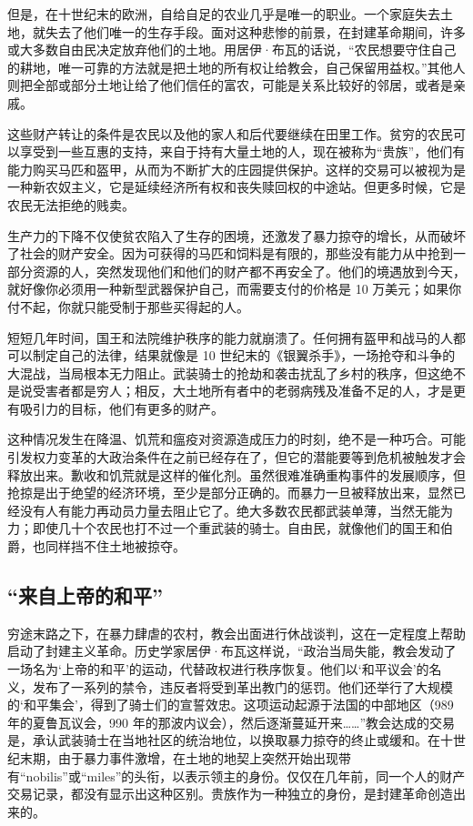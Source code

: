 但是，在十世纪末的欧洲，自给自足的农业几乎是唯一的职业。一个家庭失去土地，就失去了他们唯一的生存手段。面对这种悲惨的前景，在封建革命期间，许多或大多数自由民决定放弃他们的土地。用居伊·布瓦的话说，“农民想要守住自己的耕地，唯一可靠的方法就是把土地的所有权让给教会，自己保留用益权。”其他人则把全部或部分土地让给了他们信任的富农，可能是关系比较好的邻居，或者是亲戚。


这些财产转让的条件是农民以及他的家人和后代要继续在田里工作。贫穷的农民可以享受到一些互惠的支持，来自于持有大量土地的人，现在被称为“贵族”，他们有能力购买马匹和盔甲，从而为不断扩大的庄园提供保护。这样的交易可以被视为是一种新农奴主义，它是延续经济所有权和丧失赎回权的中途站。但更多时候，它是农民无法拒绝的贱卖。

生产力的下降不仅使贫农陷入了生存的困境，还激发了暴力掠夺的增长，从而破坏了社会的财产安全。因为可获得的马匹和饲料是有限的，那些没有能力从中抢到一部分资源的人，突然发现他们和他们的财产都不再安全了。他们的境遇放到今天，就好像你必须用一种新型武器保护自己，而需要支付的价格是 10 万美元；如果你付不起，你就只能受制于那些买得起的人。

短短几年时间，国王和法院维护秩序的能力就崩溃了。任何拥有盔甲和战马的人都可以制定自己的法律，结果就像是 10 世纪末的《银翼杀手》，一场抢夺和斗争的大混战，当局根本无力阻止。武装骑士的抢劫和袭击扰乱了乡村的秩序，但这绝不是说受害者都是穷人；相反，大土地所有者中的老弱病残及准备不足的人，才是更有吸引力的目标，他们有更多的财产。

这种情况发生在降温、饥荒和瘟疫对资源造成压力的时刻，绝不是一种巧合。可能引发权力变革的大政治条件在之前已经存在了，但它的潜能要等到危机被触发才会释放出来。歉收和饥荒就是这样的催化剂。虽然很难准确重构事件的发展顺序，但抢掠是出于绝望的经济环境，至少是部分正确的。而暴力一旦被释放出来，显然已经没有人有能力再动员力量去阻止它了。绝大多数农民都武装单薄，当然无能为力；即使几十个农民也打不过一个重武装的骑士。自由民，就像他们的国王和伯爵，也同样挡不住土地被掠夺。

\subsection{“来自上帝的和平”}
穷途末路之下，在暴力肆虐的农村，教会出面进行休战谈判，这在一定程度上帮助启动了封建主义革命。历史学家居伊·布瓦这样说，“政治当局失能，教会发动了一场名为‘上帝的和平’的运动，代替政权进行秩序恢复。他们以‘和平议会’的名义，发布了一系列的禁令，违反者将受到革出教门的惩罚。他们还举行了大规模的‘和平集会’，得到了骑士们的宣誓效忠。这项运动起源于法国的中部地区（989 年的夏鲁瓦议会，990 年的那波内议会），然后逐渐蔓延开来……”教会达成的交易是，承认武装骑士在当地社区的统治地位，以换取暴力掠夺的终止或缓和。在十世纪末期，由于暴力事件激增，在土地的地契上突然开始出现带有“nobilis”或“miles”的头衔，以表示领主的身份。仅仅在几年前，同一个人的财产交易记录，都没有显示出这种区别。贵族作为一种独立的身份，是封建革命创造出来的。

